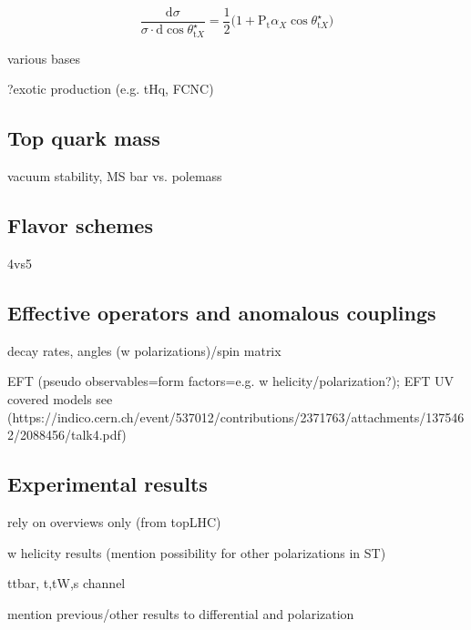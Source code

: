 \begin{equation}
\frac{\mathrm{d}\sigma}{\sigma\cdot\mathrm{d}\cos\theta^\star_{\mathrm{t}X}}=\frac{1}{2}\big(1+\mathrm{P}_\mathrm{t}\alpha_{X}\cos\theta^\star_{\mathrm{t}X}\big)
\end{equation}

various bases

?exotic production (e.g. tHq, FCNC)

\subsection{Top quark mass}

vacuum stability, MS bar vs. polemass

\subsection{Flavor schemes}

4vs5

\subsection{Effective operators and anomalous couplings}

decay rates, angles (w polarizations)/spin matrix

EFT (pseudo observables=form factors=e.g. w helicity/polarization?); EFT UV covered models see (https://indico.cern.ch/event/537012/contributions/2371763/attachments/1375462/2088456/talk4.pdf)


\subsection{Experimental results}
\label{sec:theory-exp-results}

rely on overviews only (from topLHC)

w helicity results (mention possibility for other polarizations in ST)

ttbar, t,tW,s channel

mention previous/other results to differential and polarization
